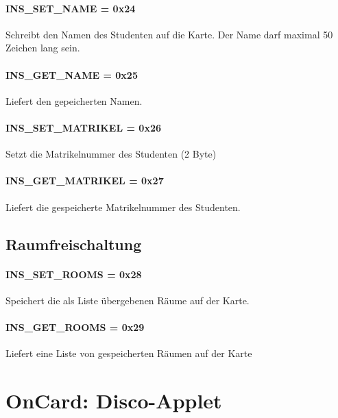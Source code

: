


\paragraph{INS\_SET\_NAME = 0x24}
Schreibt den Namen des Studenten auf die Karte.
Der Name darf maximal 50 Zeichen lang sein.
\paragraph{INS\_GET\_NAME = 0x25}
Liefert den gepeicherten Namen.

\paragraph{INS\_SET\_MATRIKEL = 0x26}
Setzt die Matrikelnummer des Studenten (2 Byte)
\paragraph{INS\_GET\_MATRIKEL = 0x27}
Liefert die gespeicherte Matrikelnummer des Studenten.

\subsection{Raumfreischaltung}

\paragraph{INS\_SET\_ROOMS = 0x28}
Speichert die als Liste übergebenen Räume auf der Karte.
\paragraph{INS\_GET\_ROOMS = 0x29}
Liefert eine Liste von gespeicherten Räumen auf der Karte

\section{OnCard: Disco-Applet}



